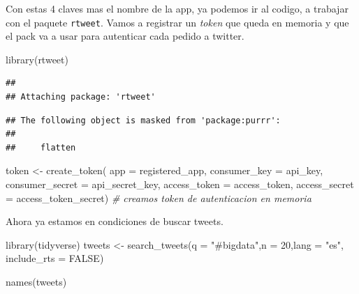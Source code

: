 \documentclass[
]{book}
\newenvironment{Shaded}{\begin{snugshade}}{\end{snugshade}}
\newcommand{\AttributeTok}[1]{\textcolor[rgb]{0.77,0.63,0.00}{#1}}
\newcommand{\CommentTok}[1]{\textcolor[rgb]{0.56,0.35,0.01}{\textit{#1}}}
\newcommand{\ConstantTok}[1]{\textcolor[rgb]{0.00,0.00,0.00}{#1}}
\newcommand{\DecValTok}[1]{\textcolor[rgb]{0.00,0.00,0.81}{#1}}
\newcommand{\FunctionTok}[1]{\textcolor[rgb]{0.00,0.00,0.00}{#1}}
\newcommand{\NormalTok}[1]{#1}
\newcommand{\OtherTok}[1]{\textcolor[rgb]{0.56,0.35,0.01}{#1}}
\newcommand{\StringTok}[1]{\textcolor[rgb]{0.31,0.60,0.02}{#1}}
\begin{document}
Con estas 4 claves mas el nombre de la app, ya podemos ir al codigo, a trabajar con el paquete \texttt{rtweet}. Vamos a registrar un \emph{token} que queda en memoria y que el pack va a usar para autenticar cada pedido a twitter.

\begin{Shaded}
\begin{Highlighting}[]
\FunctionTok{library}\NormalTok{(rtweet)}
\end{Highlighting}
\end{Shaded}

\begin{verbatim}
## 
## Attaching package: 'rtweet'
\end{verbatim}

\begin{verbatim}
## The following object is masked from 'package:purrr':
## 
##     flatten
\end{verbatim}

\begin{Shaded}
\begin{Highlighting}[]
\NormalTok{token }\OtherTok{\textless{}{-}} \FunctionTok{create\_token}\NormalTok{(}
  \AttributeTok{app =}\NormalTok{ registered\_app,}
  \AttributeTok{consumer\_key =}\NormalTok{ api\_key,}
  \AttributeTok{consumer\_secret =}\NormalTok{ api\_secret\_key,}
  \AttributeTok{access\_token =}\NormalTok{ access\_token,}
  \AttributeTok{access\_secret =}\NormalTok{ access\_token\_secret) }\CommentTok{\# creamos token de autenticacion en memoria}
\end{Highlighting}
\end{Shaded}

Ahora ya estamos en condiciones de buscar tweets.

\begin{Shaded}
\begin{Highlighting}[]
\FunctionTok{library}\NormalTok{(tidyverse)}
\NormalTok{tweets }\OtherTok{\textless{}{-}} \FunctionTok{search\_tweets}\NormalTok{(}\AttributeTok{q =} \StringTok{"\#bigdata"}\NormalTok{,}\AttributeTok{n =} \DecValTok{20}\NormalTok{,}\AttributeTok{lang =} \StringTok{"es"}\NormalTok{, }\AttributeTok{include\_rts =} \ConstantTok{FALSE}\NormalTok{)}

\FunctionTok{names}\NormalTok{(tweets)}
\end{Highlighting}
\end{Shaded}
\end{document}
